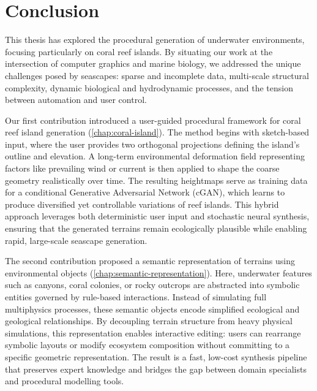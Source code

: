 \chapter*{Conclusion}



This thesis has explored the procedural generation of underwater environments, focusing particularly on coral reef islands. By situating our work at the intersection of computer graphics and marine biology, we addressed the unique challenges posed by seascapes: sparse and incomplete data, multi-scale structural complexity, dynamic biological and hydrodynamic processes, and the tension between automation and user control.

Our first contribution introduced a user-guided procedural framework for coral reef island generation (\cref{chap:coral-island}). The method begins with sketch-based input, where the user provides two orthogonal projections defining the island's outline and elevation. A long-term environmental deformation field representing factors like prevailing wind or current is then applied to shape the coarse geometry realistically over time. The resulting heightmaps serve as training data for a conditional Generative Adversarial Network (cGAN), which learns to produce diversified yet controllable variations of reef islands. This hybrid approach leverages both deterministic user input and stochastic neural synthesis, ensuring that the generated terrains remain ecologically plausible while enabling rapid, large-scale seascape generation.

The second contribution proposed a semantic representation of terrains using environmental objects (\cref{chap:semantic-representation}). Here, underwater features such as canyons, coral colonies, or rocky outcrops are abstracted into symbolic entities governed by rule-based interactions. Instead of simulating full multiphysics processes, these semantic objects encode simplified ecological and geological relationships. By decoupling terrain structure from heavy physical simulations, this representation enables interactive editing: users can rearrange symbolic layouts or modify ecosystem composition without committing to a specific geometric representation. The result is a fast, low-cost synthesis pipeline that preserves expert knowledge and bridges the gap between domain specialists and procedural modelling tools.

